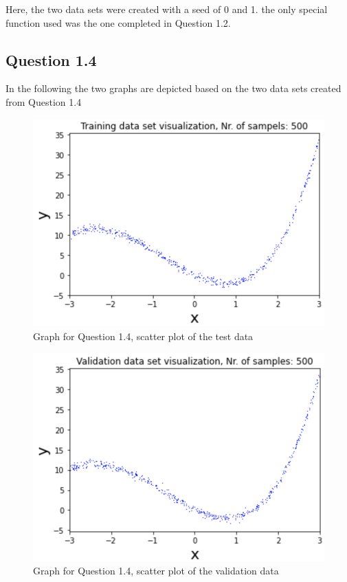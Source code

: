 \documentclass{article}
\begin{document}
Here, the two data sets were created with a seed of 0 and 1. the only special function used was the one completed in Question 1.2.

\subsection{Question 1.4}

In the following the two graphs are depicted based on the two data sets created from Question 1.4

\begin{figure}[!htb]
\centering
\includegraphics[scale = 0.8]{Question4_Graph1.png}
\caption{\label{fig:fig}Graph for Question 1.4, scatter plot of the test data}
\end{figure}

\begin{figure}[!htb]
\centering
\includegraphics[scale = 0.8]{Question4_Graph2.png}
\caption{\label{fig:fig}Graph for Question 1.4, scatter plot of the validation data}
\end{figure}
\end{document}
